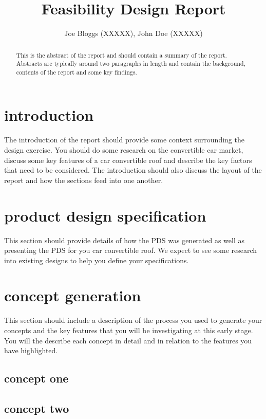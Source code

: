 \documentclass[11pt]{article}
\title{Feasibility Design Report}
\author{
Joe Bloggs (XXXXX),
John Doe (XXXXX)
}
\begin{document}
\maketitle
\thispagestyle{fancy}

\begin{abstract}

  This is the abstract of the report and should contain a summary of the report. Abstracts are typically around two paragraphs in length and contain the background, contents of the report and some key findings.

\end{abstract}

\section{introduction}

The introduction of the report should provide some context surrounding the design exercise. You should do some research on the convertible car market, discuss some key features of a car convertible roof and describe the key factors that need to be considered. The introduction should also discuss the layout of the report and how the sections feed into one another.

\section{product design specification}

This section should provide details of how the PDS was generated as well as presenting the PDS for you car convertible roof. We expect to see some research into existing designs to help you define your specifications.

\section{concept generation}

This section should include a description of the process you used to generate your concepts and the key features that you will be investigating at this early stage. You will the describe each concept in detail and in relation to the features you have highlighted.

\subsection{concept one}

\subsection{concept two}
\end{document}
